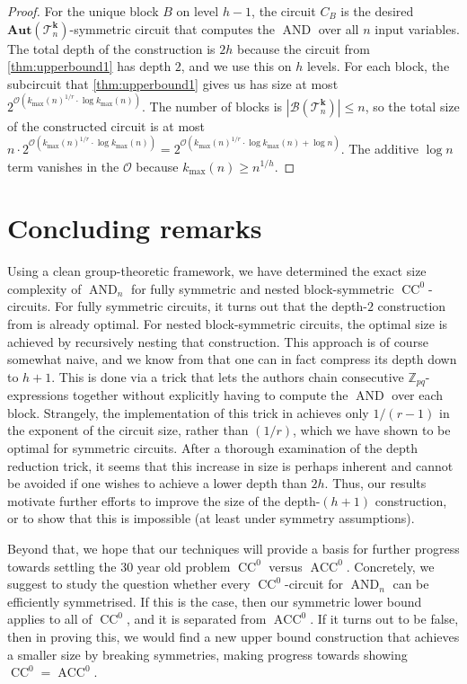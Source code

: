 \documentclass[11pt]{article}
\DeclareMathOperator{\AND}{AND}
\newcommand{\Aut}{\mathbf{Aut}}
\newcommand{\bbZ}{\mathbb{Z}}
\newcommand{\Bb}{{\mathcal B}}
\newcommand{\Oo}{{\mathcal O}}
\newcommand{\Tt}{{\mathcal T}}
\theoremstyle{definition}
\theoremstyle{plain}
\theoremstyle{remark}
\theoremstyle{remark}
\DeclareMathOperator{\CC}{CC}
\DeclareMathOperator{\ACC}{ACC}
\begin{document}
\begin{proof}
	For the unique block $B$ on level $h-1$, the circuit $C_B$ is the desired $\Aut(\Tt_n^{\boldsymbol{k}})$-symmetric circuit that computes the $\AND$ over all $n$ input variables.
	The total depth of the construction is $2h$ because the circuit from \cref{thm:upperbound1} has depth $2$, and we use this on $h$ levels. 
	For each block, the subcircuit that \cref{thm:upperbound1} gives us has size at most $2^{\Oo(k_{\text{max}}(n)^{1/r} \cdot \log k_{\text{max}}(n))}$.
	The number of blocks is $|\Bb(\Tt_n^{\boldsymbol{k}})| \leq n$, so the total size of the constructed circuit is at most $n \cdot 2^{\Oo(k_{\text{max}}(n)^{1/r} \cdot \log k_{\text{max}}(n))} = 2^{\Oo(k_{\text{max}}(n)^{1/r} \cdot \log k_{\text{max}}(n) + \log n)}$. The additive $\log n$ term vanishes in the $\Oo$ because $k_{\text{max}}(n) \geq n^{1/h}$.
\end{proof}	




\section{Concluding remarks}
Using a clean group-theoretic framework, we have determined the exact size complexity of $\AND_n$ for fully symmetric and nested block-symmetric $\CC^0$-circuits. 
For fully symmetric circuits, it turns out that the depth-$2$ construction from \cite{IdziakKK22LICS} is already optimal. For nested block-symmetric circuits, the optimal size is achieved by recursively nesting that construction. This approach is of course somewhat naive, and we know from \cite[Proposition 4.3]{IdziakKK22LICS} that one can in fact compress its depth down to $h+1$. This is done via a trick that lets the authors chain consecutive $\bbZ_{pq}$-expressions together without explicitly having to compute the $\AND$ over each block. Strangely, the implementation of this trick in \cite[Proposition 4.3]{IdziakKK22LICS} achieves only $1/(r-1)$ in the exponent of the circuit size, rather than $(1/r)$, which we have shown to be optimal for symmetric circuits. After a thorough examination of the depth reduction trick, it seems that this increase in size is perhaps inherent and cannot be avoided if one wishes to achieve a lower depth than $2h$. Thus, our results motivate further efforts to improve the size of the depth-$(h+1)$ construction, or to show that this is impossible (at least under symmetry assumptions). 

Beyond that, we hope that our techniques will provide a basis for further progress towards settling the 30 year old problem $\CC^0$ versus $\ACC^0$. Concretely, we suggest to study the question whether every $\CC^0$-circuit for $\AND_n$ can be efficiently symmetrised. If this is the case, then our symmetric lower bound applies to all of $\CC^0$, and it is separated from $\ACC^0$. If it turns out to be false, then in proving this, we would find a new upper bound construction that achieves a smaller size by breaking symmetries, making progress towards showing $\CC^0 = \ACC^0$.
\end{document}
